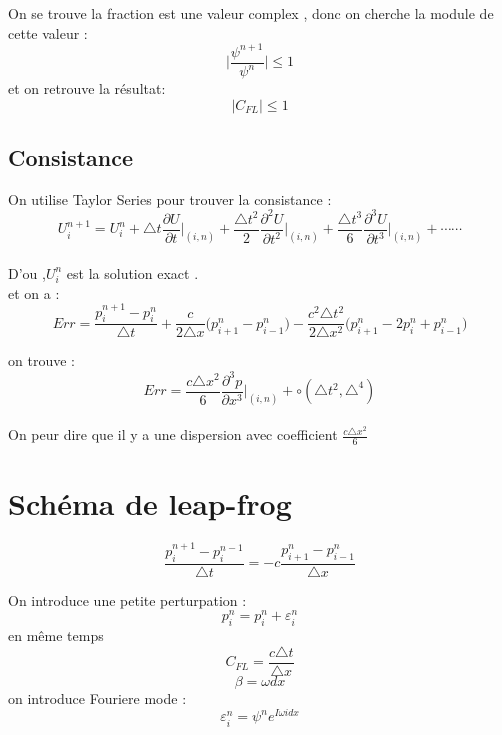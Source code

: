 \documentclass[a4paper,10pt]{report} %
\begin{document}
On se trouve la fraction est une valeur complex , donc on cherche la module de cette valeur :
$$\Big|\frac{\psi^{n+1}}{\psi^n}\Big|\leq 1$$
et on retrouve la résultat:
\begin{equation}
\Big|C_{FL}\Big|\leq 1
\end{equation}
\subsection{Consistance }
On utilise Taylor Series pour trouver la consistance :
\begin{equation}
U^{n+1}_i=U^{n}_i+\triangle t \frac{\partial U}{\partial t}\Big|_{(i,n)}+\frac{\triangle t^2}{2} \frac{\partial^2 U}{\partial t^2}\Big|_{(i,n)}+\frac{\triangle t^3}{6} \frac{\partial^3 U}{\partial t^3}\Big|_{(i,n)}+\cdots\cdots
\end{equation}
\\

D'ou ,$U^{n}_i$ est la solution exact .
\\

et on a :
$$Err=\frac{p^{n+1}_i-p^{n}_i}{\triangle t}+\frac{c}{2\triangle x}\Big(p^{n}_{i+1}-p^{n}_{i-1}\Big)-\frac{c^2\triangle t^2}{2\triangle x^2}\Big(p^{n}_{i+1}-2p^{n}_{i}+p^{n}_{i-1}\Big)$$

on trouve :
\begin{equation}
Err=\frac{c\triangle x^2}{6}\frac{\partial^3 p}{\partial x^3}\Big|_{(i,n)}+\circ(\triangle t^2,\triangle^4)
\end{equation}
\\

On peur dire que il y a une dispersion avec coefficient $\frac{c\triangle x^2}{6}$

\section{Schéma de leap-frog}

\begin{equation}
\frac{p^{n+1}_i-p^{n-1}_i}{\triangle t}= -c\frac{p^{n}_{i+1}-p^{n}_{i-1}}{\triangle x}
\end{equation}

On introduce une petite perturpation :
\begin{equation}
p^n_i=p^n_i+\varepsilon^n_i
\end{equation}
en même temps
$$C_{FL}=\frac{c\triangle t}{\triangle x}$$
$$\beta=\omega dx$$
on introduce Fouriere mode :
\begin{equation}
\varepsilon^n_i=\psi ^ne^{I\omega i dx}
\end{equation}
\end{document}
